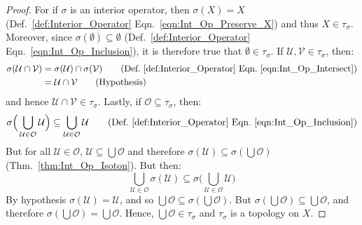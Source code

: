         \begin{proof}
            For if $\sigma$ is an interior operator, then $\sigma(X)=X$
            (Def.~\ref{def:Interior_Operator}
            Eqn.~\ref{eqn:Int_Op_Preserve_X}) and thus $X\in\tau_{\sigma}$.
            Moreover, since $\sigma(\emptyset)\subseteq\emptyset$
            (Def.~\ref{def:Interior_Operator}
            Eqn.~\ref{eqn:Int_Op_Inclusion}), it is therefore true that
            $\emptyset\in\tau_{\sigma}$. If
            $\mathcal{U},\mathcal{V}\in\tau_{\sigma}$, then:
            \begin{align}
                \sigma(\mathcal{U}\cap\mathcal{V})
                    &=\sigma(\mathcal{U})\cap\sigma(\mathcal{V})
                    \tag{Def.~\ref{def:Interior_Operator}
                        Eqn.~\ref{eqn:Int_Op_Intersect}}\\
                    &=\mathcal{U}\cap\mathcal{V}
                    \tag{Hypothesis}
            \end{align}
            and hence $\mathcal{U}\cap\mathcal{V}\in\tau_{\sigma}$. Lastly,
            if $\mathcal{O}\subseteq\tau_{\sigma}$, then:
            \begin{equation}
                \sigma\Big(
                    \bigcup_{\mathcal{U}\in\mathcal{O}}\mathcal{U}
                \Big)
                \subseteq\bigcup_{\mathcal{U}\in\mathcal{O}}\mathcal{U}
                    \tag{Def.~\ref{def:Interior_Operator}
                        Eqn.~\ref{eqn:Int_Op_Inclusion}}
            \end{equation}
            But for all $\mathcal{U}\in\mathcal{O}$,
            $\mathcal{U}\subseteq\bigcup\mathcal{O}$ and therefore
            $\sigma(\mathcal{U})\subseteq\sigma(\bigcup\mathcal{O})$
            (Thm.~\ref{thm:Int_Op_Isoton}). But then:
            \begin{equation}
                \bigcup_{\mathcal{U}\in\mathcal{O}}
                    \sigma(\mathcal{U})\subseteq
                \sigma\Big(\bigcup_{\mathcal{U}\in\mathcal{O}}
                    \mathcal{U}\Big)
            \end{equation}
            By hypothesis $\sigma(\mathcal{U})=\mathcal{U}$, and so
            $\bigcup\mathcal{O}\subseteq\sigma(\bigcup\mathcal{O})$. But
            $\sigma(\bigcup\mathcal{O})\subseteq\bigcup\mathcal{O}$,
            and therefore $\sigma(\bigcup\mathcal{O})=\bigcup\mathcal{O}$.
            Hence, $\bigcup\mathcal{O}\in\tau_{\sigma}$ and $\tau_{\sigma}$
            is a topology on $X$.
        \end{proof}
